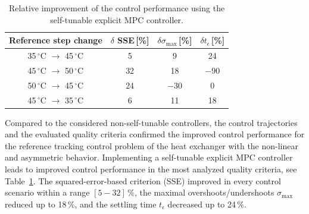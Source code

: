 \documentclass[preprint,12pt]{elsarticle}
\begin{document}
\begin{table}[h!]
	\begin{center}
		\caption{Relative improvement of the control performance using the self-tunable explicit MPC controller.}
		\label{tab:improvement}
		\begin{tabular}{c|c|c|c} 
			Reference step change & $\delta$ SSE\,[\%] & $\delta \sigma_{\mathrm{max}}$\,[\%] & $\delta t_{\epsilon}$\,[\%]  \\
			\hline
			35\,$^{\circ}$C $\rightarrow$ 45\,$^{\circ}$C &  5 &  9 & 24 \\ 
			45\,$^{\circ}$C $\rightarrow$ 50\,$^{\circ}$C & 32 & 18 &$-90$  \\ 
			50\,$^{\circ}$C $\rightarrow$ 45\,$^{\circ}$C & 24 &$-30$& 0 \\ 
			45\,$^{\circ}$C $\rightarrow$ 35\,$^{\circ}$C &  6 & 11 & 18   
		\end{tabular}
	\end{center}
\end{table}


Compared to the considered non-self-tunable controllers, the control trajectories and the evaluated quality criteria confirmed the improved control performance for the reference tracking control problem of the heat exchanger with the non-linear and asymmetric behavior. Implementing a self-tunable explicit MPC controller leads to improved control performance in the most analyzed quality criteria, see Table~\ref{tab:improvement}.	 
The squared-error-based criterion (SSE) improved in every control scenario within a range $[5-32]$\,\%, the maximal overshoots/undershoots $\sigma_{\mathrm{max}}$ reduced up to 18\,\%, and the settling time $t_{\epsilon}$ decreased up to 24\,\%.  
\end{document}
